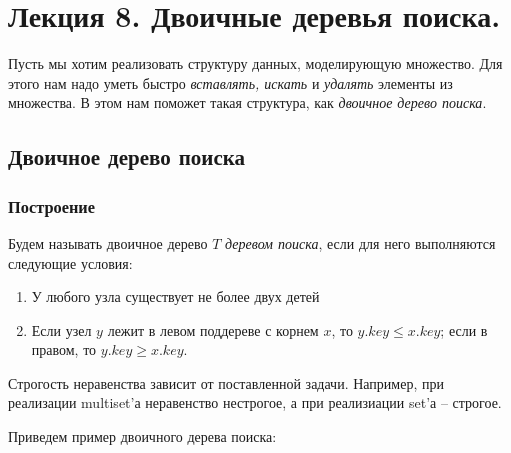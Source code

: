 \documentclass[../main.tex]{subfiles}
\begin{document}
	\section{Лекция 8. Двоичные деревья поиска.}
	
	Пусть мы хотим реализовать структуру данных, моделирующую множество. Для этого нам надо уметь быстро \textit{вставлять, искать} и \textit{удалять} элементы из множества. В этом нам поможет такая структура, как \textit{двоичное дерево поиска}.
	
	\subsection{Двоичное дерево поиска}
	 
	\subsubsection{Построение}
	
	Будем называть двоичное дерево $T$ \textit{деревом поиска}, если для него выполняются следующие условия:
	\begin{enumerate}
		\item У любого узла существует не более двух детей
		\item Если узел $y$ лежит в левом поддереве с корнем $x$, то $y.key \leqslant x.key$; если в правом, то $y.key \geqslant x.key$.
	\end{enumerate}

	\begin{remark}
		Строгость неравенства зависит от поставленной задачи. Например, при реализации multiset'а неравенство нестрогое, а при реализиации set'а -- строгое.
	\end{remark}
	
	Приведем пример двоичного дерева поиска:
	
\end{document}
